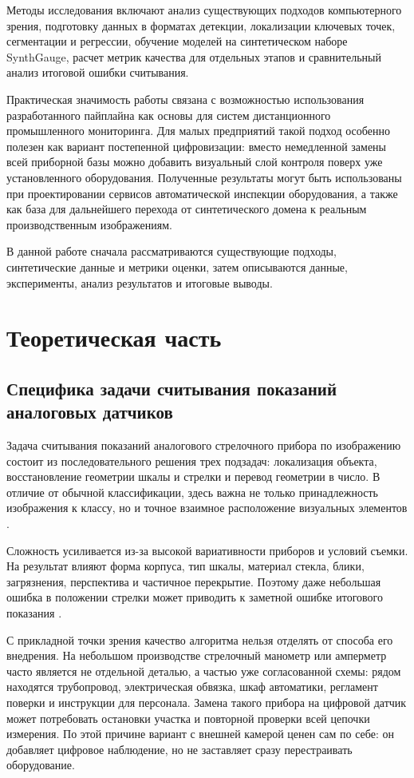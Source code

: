 \documentclass[a4paper,14pt]{extarticle}
\begin{document}
	Методы исследования включают анализ существующих подходов компьютерного зрения, подготовку данных в форматах детекции, локализации ключевых точек, сегментации и регрессии, обучение моделей на синтетическом наборе SynthGauge, расчет метрик качества для отдельных этапов и сравнительный анализ итоговой ошибки считывания.

	Практическая значимость работы связана с возможностью использования разработанного пайплайна как основы для систем дистанционного промышленного мониторинга. Для малых предприятий такой подход особенно полезен как вариант постепенной цифровизации: вместо немедленной замены всей приборной базы можно добавить визуальный слой контроля поверх уже установленного оборудования. Полученные результаты могут быть использованы при проектировании сервисов автоматической инспекции оборудования, а также как база для дальнейшего перехода от синтетического домена к реальным производственным изображениям.

	В данной работе сначала рассматриваются существующие подходы, синтетические данные и метрики оценки, затем описываются данные, эксперименты, анализ результатов и итоговые выводы.

	\newpage
	\section{Теоретическая часть}

	\subsection{Специфика задачи считывания показаний аналоговых датчиков}

Задача считывания показаний аналогового стрелочного прибора по изображению состоит из последовательного решения трех подзадач: локализация объекта, восстановление геометрии шкалы и стрелки и перевод геометрии в число. В отличие от обычной классификации, здесь важна не только принадлежность изображения к классу, но и точное взаимное расположение визуальных элементов \cite{howells2021,wang2022,reitsma2024,coords2023}.

Сложность усиливается из-за высокой вариативности приборов и условий съемки. На результат влияют форма корпуса, тип шкалы, материал стекла, блики, загрязнения, перспектива и частичное перекрытие. Поэтому даже небольшая ошибка в положении стрелки может приводить к заметной ошибке итогового показания \cite{dyer1983,adsul2021,coords2023,sciRep2025}.

С прикладной точки зрения качество алгоритма нельзя отделять от способа его внедрения. На небольшом производстве стрелочный манометр или амперметр часто является не отдельной деталью, а частью уже согласованной схемы: рядом находятся трубопровод, электрическая обвязка, шкаф автоматики, регламент поверки и инструкции для персонала. Замена такого прибора на цифровой датчик может потребовать остановки участка и повторной проверки всей цепочки измерения. По этой причине вариант с внешней камерой ценен сам по себе: он добавляет цифровое наблюдение, но не заставляет сразу перестраивать оборудование.
\end{document}

